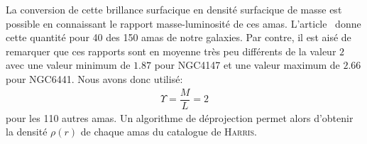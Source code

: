 				La conversion de cette brillance surfacique en densité surfacique de masse est possible
				en connaissant le rapport masse-luminosité de ces amas. L'article~\cite{McL} donne cette
				quantité pour 40 des 150 amas de notre galaxies.
				Par contre, il est aisé de remarquer que ces rapports sont en
				moyenne très peu différents de la valeur $2$ avec une
				valeur minimum de $1.87$ pour NGC4147 et une valeur maximum de
				$2.66$ pour NGC6441. Nous avons donc utilisé: %
				\begin{align}
					\Upsilon = \dfrac{M}{L} = 2
				\end{align}
				pour les 110 autres amas.
				Un algorithme de déprojection permet alors d'obtenir la densité $\rho(r)$ de chaque amas du catalogue de \textsc{Harris}.

